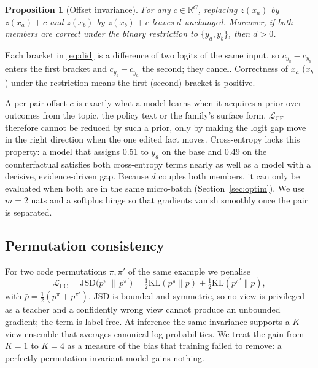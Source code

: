 \documentclass[conference]{IEEEtran}
\newcommand{\Lcf}{\mathcal{L}_{\mathrm{CF}}}
\newcommand{\Lpc}{\mathcal{L}_{\mathrm{PC}}}
\newcommand{\JSD}{\mathrm{JSD}}
\newtheorem{proposition}{Proposition}
\begin{document}
\begin{proposition}[Offset invariance]
\label{prop:offset}
For any $c\in\mathbb{R}^C$, replacing $z(x_a)$ by $z(x_a)+c$ and $z(x_b)$ by
$z(x_b)+c$ leaves $d$ unchanged. Moreover, if both members are correct under
the binary restriction to $\{y_a,y_b\}$, then $d>0$.
\end{proposition}
\begin{IEEEproof}
Each bracket in \eqref{eq:did} is a difference of two logits of the same input,
so $c_{y_a}-c_{y_b}$ enters the first bracket and $c_{y_b}-c_{y_a}$ the second;
they cancel. Correctness of $x_a$ ($x_b$) under the restriction means the first
(second) bracket is positive.
\end{IEEEproof}

A per-pair offset $c$ is exactly what a model learns when it acquires a prior
over outcomes from the topic, the policy text or the family's surface form.
$\Lcf$ therefore cannot be reduced by such a prior, only by making the logit
gap move in the right direction when the one edited fact moves. Cross-entropy
lacks this property: a model that assigns 0.51 to $y_a$ on the base and 0.49 on
the counterfactual satisfies both cross-entropy terms nearly as well as a model
with a decisive, evidence-driven gap. Because $d$ couples both members, it can
only be evaluated when both are in the same micro-batch (Section~\ref{sec:optim}). We
use $m=2$ nats and a softplus hinge so that gradients vanish smoothly once the
pair is separated.

\subsection{Permutation consistency}
\label{sec:pc}
For two code permutations $\pi,\pi'$ of the same example we penalise
\begin{equation}
\Lpc=\JSD\big(p^{\pi}\,\|\,p^{\pi'}\big)
=\tfrac12\mathrm{KL}(p^{\pi}\|\bar p)+\tfrac12\mathrm{KL}(p^{\pi'}\|\bar p),
\end{equation}
with $\bar p=\tfrac12(p^{\pi}+p^{\pi'})$. JSD is bounded and symmetric, so no
view is privileged as a teacher and a confidently wrong view cannot produce an
unbounded gradient; the term is label-free. At inference the same invariance
supports a $K$-view ensemble that averages canonical log-probabilities. We
treat the gain from $K{=}1$ to $K{=}4$ as a measure of the bias that training
failed to remove: a perfectly permutation-invariant model gains nothing.
\end{document}
